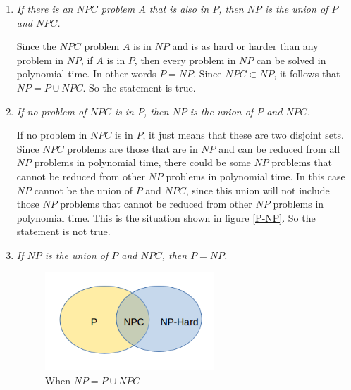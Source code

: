 \documentclass[paper=a4, fontsize=11pt]{scrartcl} %
\numberwithin{equation}{section} %
\numberwithin{figure}{section} %
\numberwithin{table}{section} %
\begin{document}
\begin{enumerate}
\begin{enumerate}
    If $P=NP$ and since $NPC \subset NP$, in this case $NP = P \cup NPC$. But it is unlikely that $P=NP$. Since $NPC$ problems are the hardest $NP$ problems, the relation $NP = P \cup NPC$ can only be satisfied if $NP - P = NPC$ (as in figure \ref{PuNPC}). i.e. if each $NP$ problem that cannot be solved in polynomial time can be reduced to any other $NP$ problem in polynomial time. This seems unlikely as it would mean that the $NP$ problems that cannot be solved is polynomial time are all NP complete. So the statement is not true.
    
    \item \textit{If there is an $NPC$ problem $A$ that is also in $P$, then $NP$ is the union of $P$ and $NPC$.}
    
Since the $NPC$ problem $A$ is in $NP$ and is as hard or harder than any problem in $NP$, if $A$ is in $P$, then every problem in $NP$ can be solved in polynomial time. In other words $P=NP$. Since $NPC \subset NP$, it follows that $NP = P \cup NPC$. So the statement is true.
    
    \item \textit{If no problem of $NPC$ is in $P$, then $NP$ is the union of $P$ and $NPC$.}
    
If no problem in $NPC$ is in $P$, it just means that these are two disjoint sets. Since $NPC$ problems are those that are in $NP$ and can be reduced from all $NP$ problems in polynomial time, there could be some $NP$ problems that cannot be reduced from other $NP$ problems in polynomial time. In this case $NP$ cannot be the union of $P$ and $NPC$, since this union will not include those $NP$ problems that cannot be reduced from other $NP$ problems in polynomial time. This is the situation shown in figure \ref{P-NP}. So the statement is not true.
    
    \item \textit{If $NP$ is the union of $P$ and $NPC$, then $P=NP$.}
    
	\begin{figure}[!h]
		\centering
		\includegraphics[width=2.5in]{PuNPC.png}
		\caption{When $NP=P \cup NPC$}
		\label{PuNPC}
	\end{figure}     
    

\end{enumerate}
\end{enumerate}
\end{document}
